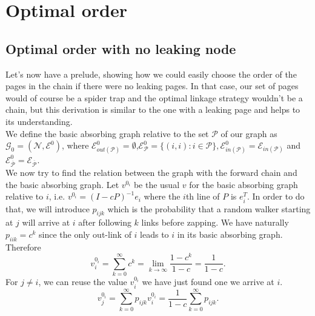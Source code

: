 \documentclass{article}
\newcommand{\1}{\mathbf{1}}
\theoremstyle{definition}
\begin{document}
\section{Optimal order}
\subsection{Optimal order with no leaking node}
\label{sec:no_leak}
Let's now have a prelude, showing how we could easily choose the order of the pages in the chain if there were
no leaking pages.
In that case, our set of pages would of course be a spider trap and the optimal linkage strategy wouldn't be a chain, but this derivation is similar
to the one with a leaking page and helps to its understanding.\\
We define the basic absorbing graph relative to the set $\mathcal{P}$ of our graph as $\mathcal{G}_0=(\mathcal{N},\mathcal{E}^0)$, where $\mathcal{E}_{out(\mathcal{P})}^0 = \emptyset$,$\mathcal{E}^0_{\mathcal{P}}=\{(i,i):i\in \mathcal{P}\},\mathcal{E}_{in(\mathcal{P})}^0 = \mathcal{E}_{in(\mathcal{P})}$ and $ \mathcal{E}^0_{\overline{\mathcal{P}}}=\mathcal{E}_{\overline{\mathcal{P}}}$.\\
We now try to find the relation between the graph with the forward chain and the basic absorbing graph.
Let $v^{0_i}$ be the usual $v$ for the basic absorbing graph relative to $i$,
i.e. $v^{0_i} = (I - cP)^{-1}e_i$ where the $i$th line of $P$ is $e_i^T$.
In order to do that, we will introduce $p_{ijk}$ which is the probability that a random walker starting at $j$
will arrive at $i$ after following $k$ links before zapping.
We have naturally $p_{iik} = c^k$ since the only out-link of $i$ leads to $i$ in its basic absorbing graph.
Therefore
\[ v_i^{0_i} = \sum_{k=0}^\infty c^k = \lim_{k \to \infty} \frac{1-c^k}{1-c} = \frac{1}{1-c}. \]
For $j \neq i$, we can reuse the value $v_i^{0_i}$ we have just found one we arrive at $i$.
\[ v_j^{0_i} = \sum_{k=0}^\infty p_{ijk} v_i^{0_i} = \frac{1}{1-c} \sum_{k=0}^\infty p_{ijk}. \]
\end{document}
